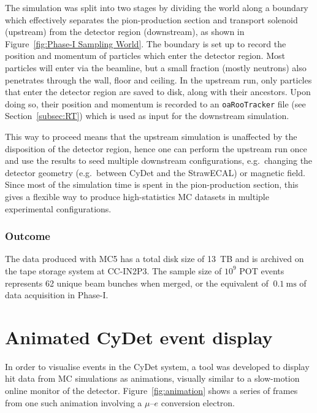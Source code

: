 The simulation was split into two stages by dividing the world along a boundary
which effectively separates the pion-production section and transport solenoid
(upstream) from the detector region (downstream), as shown in
Figure~\ref{fig:Phase-I Sampling World}. The boundary is set up to record the
position and momentum of particles which enter the detector region. Most
particles will enter via the beamline, but a small fraction (mostly neutrons)
also penetrates through the wall, floor and ceiling. In the upstream run, only
particles that enter the detector region are saved to disk, along with their
ancestors. Upon doing so, their position and momentum is recorded to an
\texttt{oaRooTracker} file (see Section~\ref{subsec:RT}) which is used as input for the
downstream simulation.

This way to proceed means that the upstream simulation is unaffected by the disposition of the detector region, hence one can perform the upstream run once and use the results to seed multiple downstream configurations, e.g.\ changing the detector geometry (e.g.\ between CyDet and the StrawECAL) or magnetic field. Since most of the simulation time is spent in the pion-production section, this gives a flexible way to produce high-statistics MC datasets in multiple experimental configurations.

\subsubsection{Outcome}
The data produced with MC5 has a total disk size of \SI{13}{TB} and is archived
on the tape storage system at CC-IN2P3. The sample size of $10^9$ POT events
represents 62 unique beam bunches when merged, or the equivalent of
$~\SI{0.1}{\ms}$ of data acquisition in Phase-I.

\section{Animated CyDet event display}
In order to visualise events in the CyDet system, a tool was developed to display
hit data from MC simulations as animations, visually similar to a slow-motion
online monitor of the detector. Figure~\ref{fig:animation} shows a series of
frames from one such animation involving a $\mu$--$e$ conversion electron.

